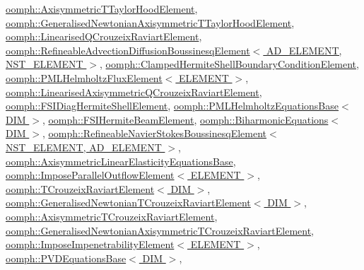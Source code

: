 \hyperlink{classoomph_1_1AxisymmetricTTaylorHoodElement_a5b492d4fc80759934938bd4c296f9237}{oomph\+::\+Axisymmetric\+T\+Taylor\+Hood\+Element}, \hyperlink{classoomph_1_1GeneralisedNewtonianAxisymmetricTTaylorHoodElement_ab5b87110b4a1c13ab828c259a28d2d36}{oomph\+::\+Generalised\+Newtonian\+Axisymmetric\+T\+Taylor\+Hood\+Element}, \hyperlink{classoomph_1_1LinearisedQCrouzeixRaviartElement_afae2721645a04e31cbd1eace58a1592d}{oomph\+::\+Linearised\+Q\+Crouzeix\+Raviart\+Element}, \hyperlink{classoomph_1_1RefineableAdvectionDiffusionBoussinesqElement_adee164161a19b307d37831c98d256d58}{oomph\+::\+Refineable\+Advection\+Diffusion\+Boussinesq\+Element$<$ A\+D\+\_\+\+E\+L\+E\+M\+E\+N\+T, N\+S\+T\+\_\+\+E\+L\+E\+M\+E\+N\+T $>$}, \hyperlink{classoomph_1_1ClampedHermiteShellBoundaryConditionElement_a189db759eda561b5ae63ae9527b3ae39}{oomph\+::\+Clamped\+Hermite\+Shell\+Boundary\+Condition\+Element}, \hyperlink{classoomph_1_1PMLHelmholtzFluxElement_a9a872ad9cdfe2400f2be301c7fd84e86}{oomph\+::\+P\+M\+L\+Helmholtz\+Flux\+Element$<$ E\+L\+E\+M\+E\+N\+T $>$}, \hyperlink{classoomph_1_1LinearisedAxisymmetricQCrouzeixRaviartElement_a3626eb04e30bef2ff695cb6c58dc59ba}{oomph\+::\+Linearised\+Axisymmetric\+Q\+Crouzeix\+Raviart\+Element}, \hyperlink{classoomph_1_1FSIDiagHermiteShellElement_aa190107f807910bf4e9d5a7e333d97a2}{oomph\+::\+F\+S\+I\+Diag\+Hermite\+Shell\+Element}, \hyperlink{classoomph_1_1PMLHelmholtzEquationsBase_ab061223c28ff7ee0c3423bcabc543161}{oomph\+::\+P\+M\+L\+Helmholtz\+Equations\+Base$<$ D\+I\+M $>$}, \hyperlink{classoomph_1_1FSIHermiteBeamElement_a61ce78842e8e4d60b9f015eee813e162}{oomph\+::\+F\+S\+I\+Hermite\+Beam\+Element}, \hyperlink{classoomph_1_1BiharmonicEquations_abf1fbd964ed367a0bf24854ee76aa8f4}{oomph\+::\+Biharmonic\+Equations$<$ D\+I\+M $>$}, \hyperlink{classoomph_1_1RefineableNavierStokesBoussinesqElement_a8e494f3887499d79d8c30c7434494b47}{oomph\+::\+Refineable\+Navier\+Stokes\+Boussinesq\+Element$<$ N\+S\+T\+\_\+\+E\+L\+E\+M\+E\+N\+T, A\+D\+\_\+\+E\+L\+E\+M\+E\+N\+T $>$}, \hyperlink{classoomph_1_1AxisymmetricLinearElasticityEquationsBase_a46c5dca6d1bc3e471f71cb44bdc06284}{oomph\+::\+Axisymmetric\+Linear\+Elasticity\+Equations\+Base}, \hyperlink{classoomph_1_1ImposeParallelOutflowElement_a3d403d29fdcbbc8954ae360331d03be4}{oomph\+::\+Impose\+Parallel\+Outflow\+Element$<$ E\+L\+E\+M\+E\+N\+T $>$}, \hyperlink{classoomph_1_1TCrouzeixRaviartElement_af9e4fcbc56441522e6111962438a3b4a}{oomph\+::\+T\+Crouzeix\+Raviart\+Element$<$ D\+I\+M $>$}, \hyperlink{classoomph_1_1GeneralisedNewtonianTCrouzeixRaviartElement_a9c235f3983f798316a76bb0a40757f56}{oomph\+::\+Generalised\+Newtonian\+T\+Crouzeix\+Raviart\+Element$<$ D\+I\+M $>$}, \hyperlink{classoomph_1_1AxisymmetricTCrouzeixRaviartElement_abc543e9ea6d95d89c87f273a365f1b39}{oomph\+::\+Axisymmetric\+T\+Crouzeix\+Raviart\+Element}, \hyperlink{classoomph_1_1GeneralisedNewtonianAxisymmetricTCrouzeixRaviartElement_a887f4ea8bcd6775f6b19d326409a8bd2}{oomph\+::\+Generalised\+Newtonian\+Axisymmetric\+T\+Crouzeix\+Raviart\+Element}, \hyperlink{classoomph_1_1ImposeImpenetrabilityElement_a0aa0ca45ff2d80ca16708224d09749de}{oomph\+::\+Impose\+Impenetrability\+Element$<$ E\+L\+E\+M\+E\+N\+T $>$}, \hyperlink{classoomph_1_1PVDEquationsBase_a749f42fea2b7138a61193c2615b2d95c}{oomph\+::\+P\+V\+D\+Equations\+Base$<$ D\+I\+M $>$}, 